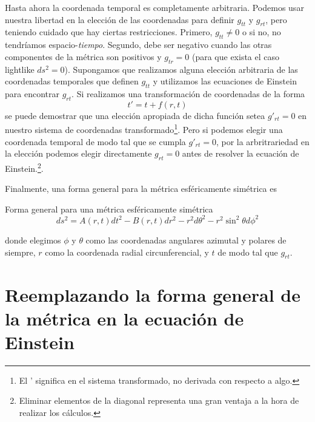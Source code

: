 Hasta ahora la coordenada temporal es completamente arbitraria. Podemos usar nuestra libertad en la elección de las coordenadas para definir $g_{tt}$ y $g_{rt}$, pero teniendo cuidado que hay ciertas restricciones. Primero, $g_{tt} \neq 0$ o si no, no tendríamos espacio-\textit{tiempo}. Segundo, debe ser negativo cuando las otras componentes de la métrica son positivos y $g_{tr}=0$ (para que exista el caso lightlike $ds^2=0$). Supongamos que realizamos alguna elección arbitraria de las coordenadas temporales que definen $g_{tt}$ y utilizamos las ecuaciones de Einstein para encontrar $g_{rt}$. Si realizamos una transformación de coordenadas de la forma 
\begin{equation*}
    t' = t + f(r,t)
\end{equation*}
se puede demostrar que una elección apropiada de dicha función setea $g'_{rt}=0$ en nuestro sistema de coordenadas transformado\footnote{El ' significa en el sistema transformado, no derivada con respecto a algo.}. Pero si podemos elegir una coordenada temporal de modo tal que se cumpla $g'_{rt}=0$, por la arbritrariedad en la elección podemos elegir directamente $g_{rt}=0$ antes de resolver la ecuación de Einstein.\footnote{Eliminar elementos de la diagonal representa una gran ventaja a la hora de realizar los cálculos.}.

Finalmente, una forma general para la métrica esféricamente simétrica es
\begin{remarkbox}{Forma general para una métrica esféricamente simétrica }
\begin{equation*}
    ds^2 = A(r,t)dt^2 - B(r,t)dr^2 - r^2d\theta^2 -r^2\sin^2{\theta}d\phi^2
\end{equation*}
\end{remarkbox}

donde elegimos $\phi$ y $\theta$ como las coordenadas angulares azimutal y polares de siempre, $r$ como la coordenada radial circunferencial, y $t$ de modo tal que $g_{rt}$.

\section{\huge{Reemplazando la forma general de la métrica en la ecuación de Einstein}}

